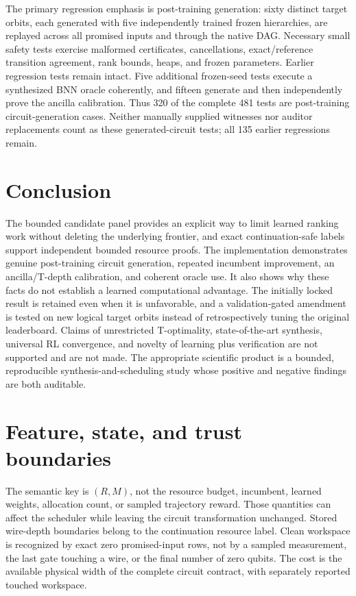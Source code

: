 \documentclass[11pt]{article}
\theoremstyle{definition}\newtheorem{definition}[theorem]{Definition}
\begin{document}
The primary regression emphasis is post-training generation: sixty distinct target orbits, each generated with five independently trained frozen hierarchies, are replayed across all promised inputs and through the native DAG. Necessary small safety tests exercise malformed certificates, cancellations, exact/reference transition agreement, rank bounds, heaps, and frozen parameters. Earlier regression tests remain intact. Five additional frozen-seed tests execute a synthesized BNN oracle coherently, and fifteen generate and then independently prove the ancilla calibration. Thus 320 of the complete 481 tests are post-training circuit-generation cases. Neither manually supplied witnesses nor auditor replacements count as these generated-circuit tests; all 135 earlier regressions remain.

\section{Conclusion}
The bounded candidate panel provides an explicit way to limit learned ranking work without deleting the underlying frontier, and exact continuation-safe labels support independent bounded resource proofs. The implementation demonstrates genuine post-training circuit generation, repeated incumbent improvement, an ancilla/T-depth calibration, and coherent oracle use. It also shows why these facts do not establish a learned computational advantage. The initially locked result is retained even when it is unfavorable, and a validation-gated amendment is tested on new logical target orbits instead of retrospectively tuning the original leaderboard. Claims of unrestricted T-optimality, state-of-the-art synthesis, universal RL convergence, and novelty of learning plus verification are not supported and are not made. The appropriate scientific product is a bounded, reproducible synthesis-and-scheduling study whose positive and negative findings are both auditable.

\appendix
\section{Feature, state, and trust boundaries}
The semantic key is $(R,M)$, not the resource budget, incumbent, learned weights, allocation count, or sampled trajectory reward. Those quantities can affect the scheduler while leaving the circuit transformation unchanged. Stored wire-depth boundaries belong to the continuation resource label. Clean workspace is recognized by exact zero promised-input rows, not by a sampled measurement, the last gate touching a wire, or the final number of zero qubits. The cost is the available physical width of the complete circuit contract, with separately reported touched workspace.
\end{document}
